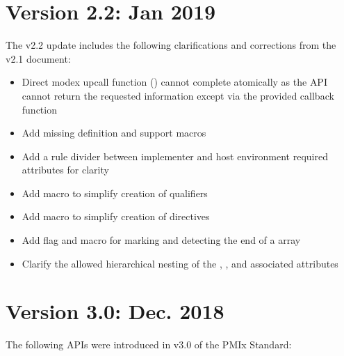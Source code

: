 {%
\section{Version 2.2: Jan 2019}

The v2.2 update includes the following clarifications and corrections from the v2.1 document:

\begin{itemize}
    \item Direct modex upcall function () cannot complete atomically as the \ac{API} cannot return the requested information except via the provided callback function
    \item Add missing  definition and support macros
    \item Add a rule divider between implementer and host environment required attributes for clarity
    \item Add  macro to simplify creation of  qualifiers
    \item Add  macro to simplify creation of  directives
    \item Add flag and  macro for marking and detecting the end of a  array
    \item Clarify the allowed hierarchical nesting of the , , and associated attributes
\end{itemize}

\section{Version 3.0: Dec. 2018}

The following \acp{API} were introduced in v3.0 of the PMIx Standard:

}
